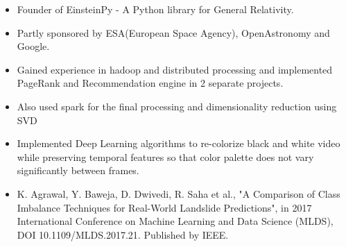 \begin{itemize}
\item Founder of EinsteinPy - A Python library for General Relativity.
\item Partly sponsored by ESA(European Space Agency), OpenAstronomy and Google.
\end{itemize}
\smallskip

\begin{itemize}
    \item Gained experience in hadoop and distributed processing and implemented PageRank and Recommendation engine in 2 separate projects.
    \item Also used spark for the final processing and dimensionality reduction using SVD
\end{itemize}
\smallskip

\begin{itemize}
    \item Implemented Deep Learning algorithms to re-colorize black and white video while preserving temporal features so that color palette does not vary significantly between frames.
\end{itemize}
\smallskip


\smallskip
\begin{itemize}
\item K. Agrawal, Y. Baweja, D. Dwivedi, R. Saha et al., "A Comparison of Class Imbalance Techniques for Real-World Landslide Predictions", in 2017 International Conference on Machine Learning and Data Science (MLDS), DOI 10.1109/MLDS.2017.21. Published by IEEE.
\end{itemize}
